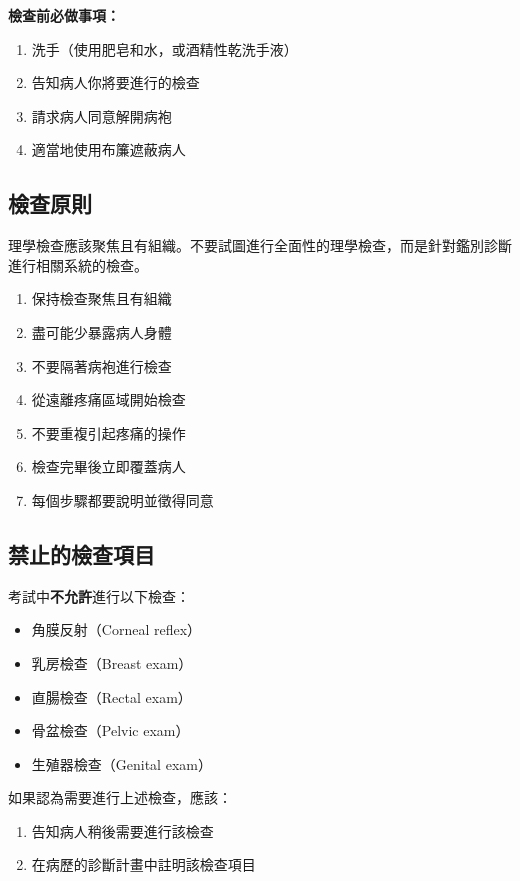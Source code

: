 \documentclass[12pt,a4paper]{article}
\newcommand{\note}[1]{
    \par
    \noindent
    \begin{tcolorbox}[
        colback=emergency_blue!5!white,
        colframe=emergency_blue,
        title=\textbf{重點提醒},
        fonttitle=\bfseries,
        boxrule=0.5pt,
        arc=3pt,
        left=6pt,
        right=6pt,
        top=6pt,
        bottom=6pt
    ]
    #1
    \end{tcolorbox}
}
\begin{document}
\begin{importantbox}
\textbf{檢查前必做事項：}
\begin{enumerate}
    \item 洗手（使用肥皂和水，或酒精性乾洗手液）
    \item 告知病人你將要進行的檢查
    \item 請求病人同意解開病袍
    \item 適當地使用布簾遮蔽病人
\end{enumerate}
\end{importantbox}

\subsection{檢查原則}

\note{理學檢查應該聚焦且有組織。不要試圖進行全面性的理學檢查，而是針對鑑別診斷進行相關系統的檢查。}

\begin{enumerate}
    \item 保持檢查聚焦且有組織
    \item 盡可能少暴露病人身體
    \item 不要隔著病袍進行檢查
    \item 從遠離疼痛區域開始檢查
    \item 不要重複引起疼痛的操作
    \item 檢查完畢後立即覆蓋病人
    \item 每個步驟都要說明並徵得同意
\end{enumerate}

\subsection{禁止的檢查項目}

\begin{tcolorbox}[colback=emergency_red!10!white,colframe=emergency_red,title=\textbf{禁止進行的檢查}]
考試中\textbf{不允許}進行以下檢查：
\begin{itemize}
    \item 角膜反射（Corneal reflex）
    \item 乳房檢查（Breast exam）
    \item 直腸檢查（Rectal exam）
    \item 骨盆檢查（Pelvic exam）
    \item 生殖器檢查（Genital exam）
\end{itemize}

如果認為需要進行上述檢查，應該：
\begin{enumerate}
    \item 告知病人稍後需要進行該檢查
    \item 在病歷的診斷計畫中註明該檢查項目
\end{enumerate}
\end{tcolorbox}
\end{document}
